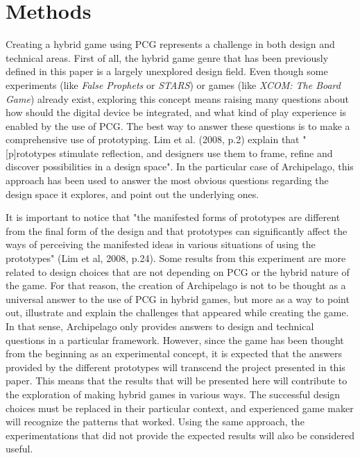 \section{Methods}
Creating a hybrid game using PCG represents a challenge in both design and technical areas. First of all, the hybrid game genre that has been previously defined in this paper is a largely unexplored design field. Even though some experiments (like \textit{False Prophets} or \textit{STARS}) or games (like \textit{XCOM: The Board Game}) already exist, exploring this concept means raising many questions about how should the digital device be integrated, and what kind of play experience is enabled by the use of PCG. The best way to answer these questions is to make a comprehensive use of prototyping. Lim et al. (2008, p.2) explain that "[p]rototypes stimulate reflection, and designers use them to frame, refine and discover possibilities in a design space". In the particular case of Archipelago, this approach has been used to answer the most obvious questions regarding the design space it explores, and point out the underlying ones. 

It is important to notice that "the manifested forms of prototypes are different from the final form of the design and that prototypes can significantly affect the ways of perceiving the manifested ideas in various situations of using
the prototypes" (Lim et al, 2008, p.24). Some results from this experiment are more related to design choices that are not depending on PCG or the hybrid nature of the game. For that reason, the creation of Archipelago is not to be thought as a universal answer to the use of PCG in hybrid games, but more as a way to point out, illustrate and explain the challenges that appeared while creating the game. In that sense, Archipelago only provides answers to design and technical questions in a particular framework. However, since the game has been thought from the beginning as an experimental concept, it is expected that the answers provided by the different prototypes will transcend the project presented in this paper. This means that the results that will be presented here will contribute to the exploration of making hybrid games in various ways. The successful design choices must be replaced in their particular context, and experienced game maker will recognize the patterns that worked. Using the same approach, the experimentations that did not provide the expected results will also be considered useful.\\

